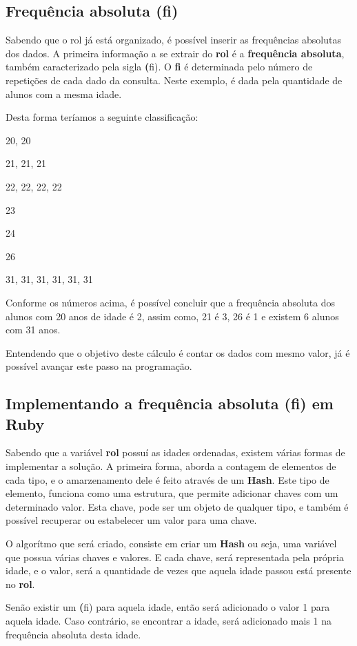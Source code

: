\documentclass[12pt]{article}
\newcommand{\code}[1] {\textbf{#1}}
\begin{document}
\subsection { Frequência absoluta (fi) }

Sabendo que o rol já está organizado, é possível inserir  as frequências absolutas dos dados. A primeira informação a se extrair do \code{rol} é a \code{frequência absoluta}, também caracterizado pela sigla \code(fi). O \code{fi} é determinada pelo número de repetições de cada dado da consulta. Neste exemplo, é dada pela quantidade de alunos com a mesma idade.

Desta forma teríamos a seguinte classificação:

20, 20

21, 21, 21

22, 22, 22, 22

23

24

26

31, 31, 31, 31, 31, 31


Conforme os números acima, é possível concluir que a frequência absoluta dos alunos com 20 anos de idade é 2, assim como, 21 é 3, 26 é 1 e existem 6 alunos com 31 anos.

Entendendo que o objetivo deste cálculo é contar os dados com mesmo valor, já é possível avançar este passo na programação.

\subsection { Implementando a frequência absoluta (fi) em Ruby }

Sabendo que a variável \code{rol} possuí as idades ordenadas, existem várias formas de implementar a solução. A primeira forma, aborda a contagem de elementos de cada tipo, e o amarzenamento dele é feito através de um \code{Hash}. Este tipo de elemento, funciona como uma estrutura, que permite adicionar chaves com um determinado valor. Esta chave, pode ser um objeto de qualquer tipo, e também é possível recuperar ou estabelecer um valor para uma chave.

O algorítmo que será criado, consiste em criar um \code{Hash} ou seja, uma variável que possua várias chaves e valores. E cada chave, será representada pela própria idade, e o valor, será a quantidade de vezes que aquela idade passou está presente no \code{rol}. 

Senão existir um \code(fi) para aquela idade, então será adicionado o valor 1 para aquela idade.
Caso contrário, se encontrar a idade, será adicionado mais 1 na frequência absoluta desta idade.
\end{document}
